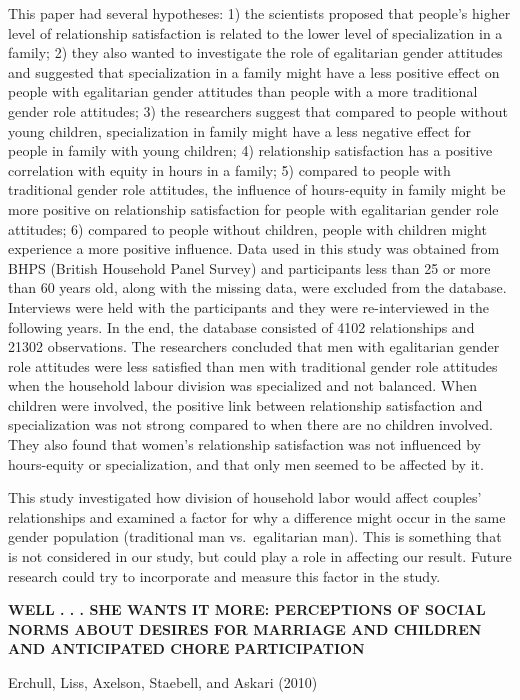 \documentclass[
  english,
  man]{apa6}
\begin{document}
This paper had several hypotheses: 1) the scientists proposed that people's higher level of relationship satisfaction is related to the lower level of specialization in a family; 2) they also wanted to investigate the role of egalitarian gender attitudes and suggested that specialization in a family might have a less positive effect on people with egalitarian gender attitudes than people with a more traditional gender role attitudes; 3) the researchers suggest that compared to people without young children, specialization in family might have a less negative effect for people in family with young children; 4) relationship satisfaction has a positive correlation with equity in hours in a family; 5) compared to people with traditional gender role attitudes, the influence of hours-equity in family might be more positive on relationship satisfaction for people with egalitarian gender role attitudes; 6) compared to people without children, people with children might experience a more positive influence. Data used in this study was obtained from BHPS (British Household Panel Survey) and participants less than 25 or more than 60 years old, along with the missing data, were excluded from the database. Interviews were held with the participants and they were re-interviewed in the following years. In the end, the database consisted of 4102 relationships and 21302 observations. The researchers concluded that men with egalitarian gender role attitudes were less satisfied than men with traditional gender role attitudes when the household labour division was specialized and not balanced. When children were involved, the positive link between relationship satisfaction and specialization was not strong compared to when there are no children involved. They also found that women's relationship satisfaction was not influenced by hours-equity or specialization, and that only men seemed to be affected by it.

This study investigated how division of household labor would affect couples' relationships and examined a factor for why a difference might occur in the same gender population (traditional man vs.~egalitarian man). This is something that is not considered in our study, but could play a role in affecting our result. Future research could try to incorporate and measure this factor in the study.

\textbf{WELL . . . SHE WANTS IT MORE: PERCEPTIONS OF SOCIAL NORMS ABOUT DESIRES FOR MARRIAGE AND CHILDREN AND ANTICIPATED CHORE PARTICIPATION}

Erchull, Liss, Axelson, Staebell, and Askari (2010)
\end{document}

